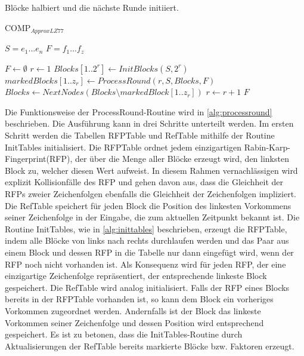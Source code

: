 Blöcke halbiert und die nächste Runde initiiert.
\begin{algorithm}[ht]
\centering
\caption{COMP$_{ApproxLZ77}$} \label{alg:compapproxlz77}
\algorithmicrequire $S=e_1...e_n$
\algorithmicensure $F=f_1...f_z$
\begin{algorithmic}[1]
    \STATE $F \gets \emptyset$
    \STATE $r \gets 1$
    \STATE $Blocks[1..2^r] \gets InitBlocks(S, 2^r)$ 
        \STATE $markedBlocks[1..z_r] \gets ProcessRound(r, S, Blocks, F)$
        \STATE $Blocks \gets NextNodes(Blocks\setminus markedBlock[1..z_r])$ 
        \STATE $r \gets r+1$
    \ENDWHILE
    \RETURN $F$
\end{algorithmic}
\end{algorithm}

Die Funktionsweise der ProcessRound-Routine wird in \ref{alg:processround} beschrieben. Die Ausführung kann in drei Schritte unterteilt werden. Im ersten Schritt werden die Tabellen RFPTable und RefTable
mithilfe der Routine InitTables initialisiert. Die RFPTable ordnet jedem einzigartigen Rabin-Karp-Fingerprint(RFP), der über die Menge aller Blöcke erzeugt wird, den linksten Block zu, welcher diesen 
Wert aufweist. In diesem Rahmen vernachlässigen wird explizit Kollisionfälle des RFP und gehen davon aus, dass die Gleichheit der RFPs zweier Zeichenfolgen ebenfalls die Gleichheit der Zeichenfolgen impliziert.
Die RefTable speichert für jeden Block die Position des linkesten Vorkommens seiner Zeichenfolge in der Eingabe, die zum aktuellen Zeitpunkt bekannt ist.
Die Routine InitTables, wie in \ref{alg:inittables} beschrieben, erzeugt die RFPTable, indem alle Blöcke von links nach rechts durchlaufen werden und das Paar aus einem Block und dessen RFP in die Tabelle
nur dann eingefügt wird, wenn der RFP noch nicht vorhanden ist. Als Konsequenz wird für jeden RFP, der eine einzigartige Zeichenfolge repräsentiert, der entsprechende linkeste Block gespeichert. Die RefTable
wird analog initialisiert. Falls der RFP eines Blocks bereits in der RFPTable vorhanden ist, so kann dem Block ein vorheriges Vorkommen zugeordnet werden. Andernfalls ist der Block das linkeste Vorkommen seiner
Zeichenfolge und dessen Position wird entsprechend gespeichert. Es ist zu betonen, dass die InitTables-Routine durch Aktualisierungen der RefTable bereits markierte Blöcke bzw. Faktoren erzeugt.

